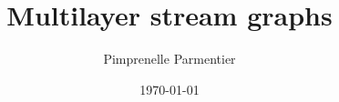\documentclass[15pt]{beamer}
\title{Multilayer stream graphs} %
\author{Pimprenelle Parmentier} %
\date{\today} %
\begin{document}
\begin{frame}
\titlepage %
\end{frame}



\end{document}
